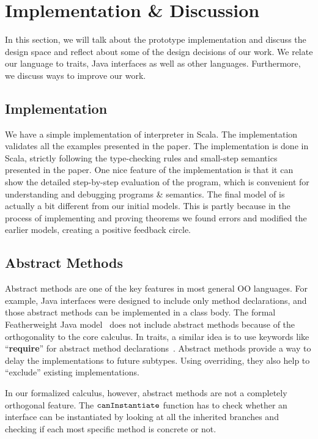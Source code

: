 \section{Implementation \& Discussion}\label{sec:discussion}
In this section, we will talk about the prototype implementation and discuss the design space and reflect about some of the design decisions of our work. We relate our language to traits, Java interfaces as well as other languages. Furthermore, we discuss ways to improve our work.

\subsection{Implementation}
We have a simple implementation of \name{} interpreter in Scala. The implementation validates all the examples presented in the paper. The implementation is done in 
Scala, strictly following the type-checking rules and small-step semantics
presented in the paper. One nice feature of the implementation is that it can
show the detailed step-by-step evaluation of the program, which is convenient for
understanding and debugging programs \& semantics. The final model of \name{}
is actually a bit different from our initial models. This is partly because in
the process of implementing and proving theorems we found errors and modified
the earlier models, creating a positive feedback circle.

\subsection{Abstract Methods}

Abstract methods are one of the key features in most general OO languages. For example, Java interfaces were designed
to include only method declarations, and those abstract methods can be implemented in a class body. 
The formal Featherweight Java model~\cite{Igarashi01FJ} does not include abstract methods because of the orthogonality
to the core calculus. In traits, a
similar idea is to use keywords like ``\textbf{require}'' for abstract method declarations~\cite{scharli03traits}.
Abstract methods provide a way to
delay the implementations to future subtypes. Using overriding, they also help to ``exclude'' existing implementations.

In our formalized calculus, however, abstract methods are not a completely orthogonal feature. The $\texttt{canInstantiate}$ function
has to check whether an interface can be instantiated by looking at all the inherited branches and checking if each most specific method is concrete or not.

